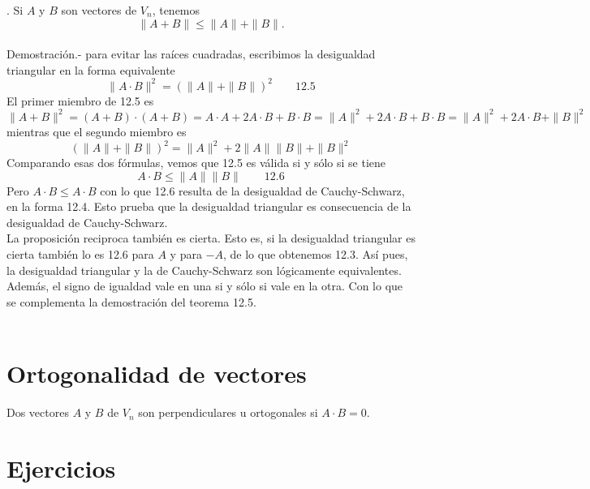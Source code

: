 \begin{teo}. Si $A$ y $B$ son vectores de $V_n$, tenemos $$\|A+B\| \leq \|A\|+\|B\|.$$\\
    Demostración.-\; para evitar las raíces cuadradas, escribimos la desigualdad triangular en la forma equivalente $$\|A\cdot B\|^2 = \left(\|A\|+\|B\|\right)^2\qquad \mbox{12.5}$$
    El primer miembro de 12.5 es $$\|A+B\|^2 = (A+B)\cdot (A+B) = A\cdot A + 2A\cdot B + B\cdot B = \|A\|^2 + 2A\cdot B + B\cdot B = \|A\|^2 + 2A\cdot B + \|B\|^2$$
    mientras que el segundo miembro es $$\left(\|A\|+\|B\|\right)^2 = \|A\|^2 + 2\|A\|\|B\|+\|B\|^2$$
    Comparando esas dos fórmulas, vemos que 12.5 es válida si y sólo si se tiene $$A\cdot B \leq \|A\|\|B\|\qquad 12.6$$
    Pero $A\cdot B\leq A\cdot B$ con lo que 12.6 resulta de la desigualdad de Cauchy-Schwarz, en la forma 12.4. Esto prueba que la desigualdad triangular es consecuencia de la desigualdad de Cauchy-Schwarz.\\
    La proposición reciproca también es cierta. Esto es, si la desigualdad triangular es cierta también lo es 12.6 para $A$ y para $-A$, de lo que obtenemos 12.3. Así pues, la desigualdad triangular y la de Cauchy-Schwarz son lógicamente equivalentes. Además, el signo de igualdad vale en una si y sólo si vale en la otra. Con lo que se complementa la demostración del teorema 12.5.\\\\

\end{teo}

\section{Ortogonalidad de vectores}

\begin{tcolorbox}[colframe=white]
\begin{def.} Dos vectores $A$ y $B$ de $V_n$ son perpendiculares u ortogonales si $A\cdot B=0$.
\end{def.}
\end{tcolorbox}


\section{Ejercicios}


